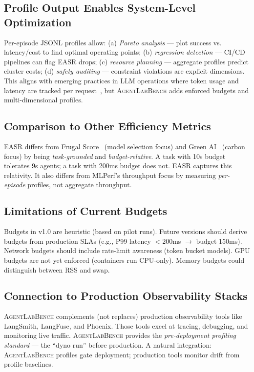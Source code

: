 \documentclass[letterpaper, 10 pt, conference]{ieeeconf}
\newcommand{\agentslabench}{\textsc{AgentLabBench}}
\newcommand{\easr}{\textsc{EASR}}
\begin{document}
\subsection{Profile Output Enables System-Level Optimization}
Per-episode JSONL profiles allow: (a) \textit{Pareto analysis} --- plot success vs. latency/cost to find optimal operating points; (b) \textit{regression detection} --- CI/CD pipelines can flag \easr{} drops; (c) \textit{resource planning} --- aggregate profiles predict cluster costs; (d) \textit{safety auditing} --- constraint violations are explicit dimensions. This aligns with emerging practices in LLM operations where token usage and latency are tracked per request~\cite{langsmith2024production, langfuse2024}, but \agentslabench{} adds enforced budgets and multi-dimensional profiles.

\subsection{Comparison to Other Efficiency Metrics}
\easr{} differs from Frugal Score~\cite{lin2023frugal} (model selection focus) and Green AI~\cite{schwartz2020green} (carbon focus) by being \textit{task-grounded} and \textit{budget-relative}. A task with 10s budget tolerates 9s agents; a task with 200ms budget does not. \easr{} captures this relativity. It also differs from MLPerf's throughput focus by measuring \textit{per-episode} profiles, not aggregate throughput.

\subsection{Limitations of Current Budgets}
Budgets in v1.0 are heuristic (based on pilot runs). Future versions should derive budgets from production SLAs (e.g., P99 latency $<200$ms $\to$ budget 150ms). Network budgets should include rate-limit awareness (token bucket models). GPU budgets are not yet enforced (containers run CPU-only). Memory budgets could distinguish between RSS and swap.

\subsection{Connection to Production Observability Stacks}
\agentslabench{} complements (not replaces) production observability tools like LangSmith, LangFuse, and Phoenix. Those tools excel at tracing, debugging, and monitoring live traffic. \agentslabench{} provides the \textit{pre-deployment profiling standard} --- the ``dyno run'' before production. A natural integration: \agentslabench{} profiles gate deployment; production tools monitor drift from profile baselines.
\end{document}
